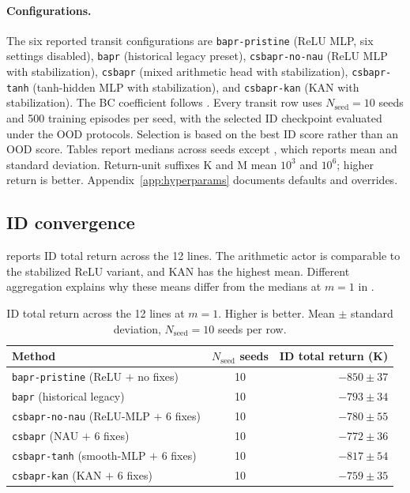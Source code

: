 \documentclass[10pt]{article}
\begin{document}
\paragraph{Configurations.}
The six reported transit configurations are \texttt{bapr-pristine} (ReLU MLP, six settings disabled), \texttt{bapr} (historical legacy preset), \texttt{csbapr-no-nau} (ReLU MLP with stabilization), \texttt{csbapr} (mixed arithmetic head with stabilization), \texttt{csbapr-tanh} (tanh-hidden MLP with stabilization), and \texttt{csbapr-kan} (KAN with stabilization). The BC coefficient follows . Every transit row uses $N_{\mathrm{seed}}=10$ seeds and 500 training episodes per seed, with the selected ID checkpoint evaluated under the OOD protocols. Selection is based on the best ID score rather than an OOD score. Tables report medians across seeds except , which reports mean and standard deviation. Return-unit suffixes K and M mean $10^3$ and $10^6$; higher return is better. Appendix~\ref{app:hyperparams} documents defaults and overrides.

\subsection{ID convergence}
\label{sec:id_results}

 reports ID total return across the 12 lines. The arithmetic actor is comparable to the stabilized ReLU variant, and KAN has the highest mean. Different aggregation explains why these means differ from the medians at $m=1$ in .


\begin{table}[htbp]
\centering
\caption{ID total return across the 12 lines at $m=1$. Higher is better. Mean $\pm$ standard deviation, $N_{\mathrm{seed}}{=}10$ seeds per row.}
\label{tab:main}
\begin{tabular}{lcr}
\toprule
Method & $N_{\mathrm{seed}}$ seeds & ID total return (K) \\
\midrule
\texttt{bapr-pristine} (ReLU $+$ no fixes)        & 10 & $-850 \pm 37$ \\
\texttt{bapr} (historical legacy)              & 10 & $-793 \pm 34$ \\
\texttt{csbapr-no-nau} (ReLU-MLP $+$ 6 fixes)     & 10 & $-780 \pm 55$ \\
\texttt{csbapr} (NAU $+$ 6 fixes)                 & 10 & $-772 \pm 36$ \\
\texttt{csbapr-tanh} (smooth-MLP $+$ 6 fixes)     & 10 & $-817 \pm 54$ \\
\texttt{csbapr-kan} (KAN $+$ 6 fixes)             & 10 & $-759 \pm 35$ \\
\bottomrule
\end{tabular}
\end{table}
\end{document}
